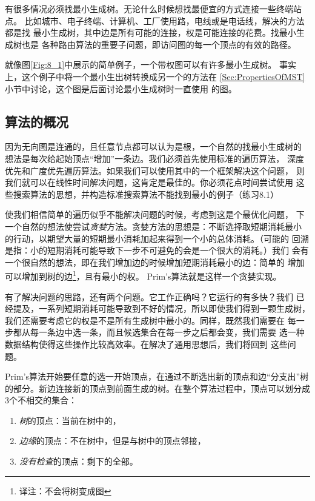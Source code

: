 有很多情况必须找最小生成树。无论什么时候想找最便宜的方式连接一些终端站点。
比如城市、电子终端、计算机、工厂使用路，电线或是电话线，解决的方法都是找
最小生成树，其中边是所有可能的连接，权是可能连接的花费。找最小生成树也是
各种路由算法的重要子问题，即访问图的每一个顶点的有效的路径。

就像图\ref{Fig:8_1}中展示的简单例子，一个带权图可以有许多最小生成树。
事实上，这个例子中将一个最小生出树转换成另一个的方法在
\ref{Sec:PropertiesOfMST}小节中讨论，这个图是后面讨论最小生成树时一直使用
的图。

\subsection{算法的概况}
因为无向图是连通的，且任意节点都可以认为是根，一个自然的找最小生成树的
想法是每次给起始顶点“增加”一条边。我们必须首先使用标准的遍历算法，
深度优先和广度优先遍历算法。如果我们可以使用其中的一个框架解决这个问题，
则我们就可以在线性时间解决问题，这肯定是最佳的。你必须花点时间尝试使用
这些搜索算法的思想，并构造标准搜索算法不能找到最小的例子（练习8.1）

使我们相信简单的遍历似乎不能解决问题的时候，考虑到这是个最优化问题，
下一个自然的想法使尝试\emph{贪婪}方法。贪婪方法的思想是：不断选择取短期消耗最小
的行动，以期望大量的短期最小消耗加起来得到一个小的总体消耗。（可能的
回溯是指：小的短期消耗可能导致下一步不可避免的会是一个很大的消耗。）我们
会有一个很自然的想法，即在我们增加边的时候增加短期消耗最小的边：简单的
增加可以增加到树的边\footnote{译注：不会将树变成图}，且有最小的权。
Prim's算法就是这样一个贪婪实现。

有了解决问题的思路，还有两个问题。它工作正确吗？它运行的有多快？我们
已经提及，一系列短期消耗可能导致到不好的情况，所以即使我们得到一颗生成树，
我们还需要考虑它的权是不是所有生成树中最小的。同样，既然我们需要在
每一步都从每一条边中选一条，而且候选集合在每一步之后都会变，我们需要
选一种数据结构使得这些操作比较高效率。在解决了通用思想后，我们将回到
这些问题。

Prim's算法开始要任意的选一开始顶点，在通过不断选出新的顶点和边“分支出”树
的部分。新边连接新的顶点到前面生成的树。在整个算法过程中，顶点可以划分成
3个不相交的集合：
\begin{enumerate}
\item \emph{树}的顶点：当前在树中的，
\item \emph{边缘}的顶点：不在树中，但是与树中的顶点邻接，
\item \emph{没有检查}的顶点：剩下的全部。
\end{enumerate}

